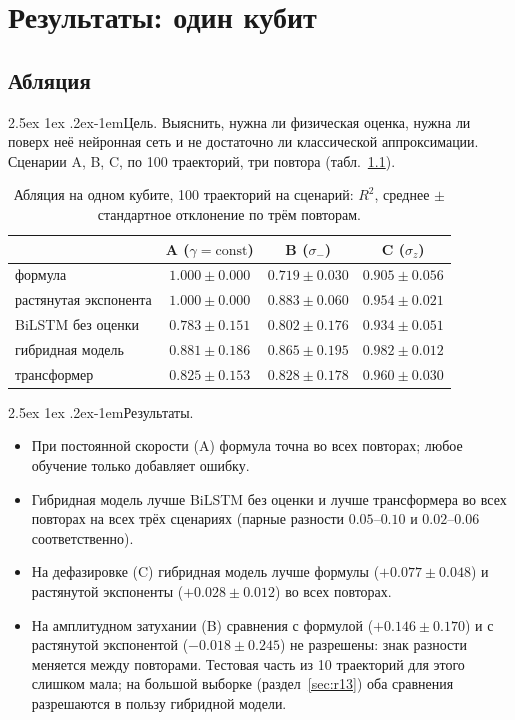 \documentclass[12pt,a4paper]{report}
\makeatletter
\renewcommand\paragraph{\@startsection{paragraph}{4}{\z@}%
  {2.5ex \@plus1ex \@minus.2ex}{-1em}{\normalfont\normalsize\bfseries}}
\numberwithin{equation}{chapter}
\makeatother
\begin{document}
\chapter{Результаты: один кубит}
\label{chap:res1}

\section{Абляция}
\label{sec:e1}

\paragraph{Цель.} Выяснить, нужна ли физическая оценка, нужна ли поверх неё
нейронная сеть и не достаточно ли классической аппроксимации. Сценарии
A, B, C, по 100 траекторий, три повтора (табл.~\ref{tab:e1}).

\begin{table}[h]
\centering
\caption{Абляция на одном кубите, 100 траекторий на сценарий: $R^2$, среднее
$\pm$ стандартное отклонение по трём повторам.}
\label{tab:e1}
\small
\begin{tabular}{@{}lccc@{}}
\toprule
 & A ($\gamma=\mathrm{const}$) & B ($\sigma_-$) & C ($\sigma_z$) \\
\midrule
формула & $1.000\pm0.000$ & $0.719\pm0.030$ & $0.905\pm0.056$ \\
растянутая экспонента & $1.000\pm0.000$ & $\mathbf{0.883\pm0.060}$ & $0.954\pm0.021$ \\
BiLSTM без оценки & $0.783\pm0.151$ & $0.802\pm0.176$ & $0.934\pm0.051$ \\
гибридная модель & $0.881\pm0.186$ & $0.865\pm0.195$ & $\mathbf{0.982\pm0.012}$ \\
трансформер & $0.825\pm0.153$ & $0.828\pm0.178$ & $0.960\pm0.030$ \\
\bottomrule
\end{tabular}
\end{table}

\paragraph{Результаты.}
\begin{itemize}
\item При постоянной скорости (A) формула точна во всех повторах; любое
      обучение только добавляет ошибку.
\item Гибридная модель лучше BiLSTM без оценки и лучше трансформера во всех
      повторах на всех трёх сценариях (парные разности $0.05$--$0.10$ и
      $0.02$--$0.06$ соответственно).
\item На дефазировке (C) гибридная модель лучше формулы ($+0.077\pm0.048$) и
      растянутой экспоненты ($+0.028\pm0.012$) во всех повторах.
\item На амплитудном затухании (B) сравнения с формулой ($+0.146\pm0.170$) и
      с растянутой экспонентой ($-0.018\pm0.245$) не разрешены: знак
      разности меняется между повторами. Тестовая часть из 10 траекторий
      для этого слишком мала; на большой выборке (раздел~\ref{sec:r13})
      оба сравнения разрешаются в пользу гибридной модели.
\end{itemize}
\end{document}
